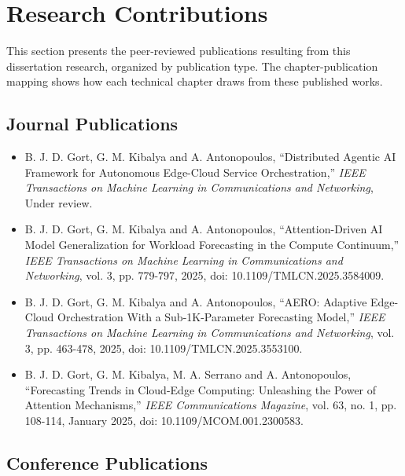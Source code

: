 \section{Research Contributions}
\label{sec:ch1_research_contributions}

This section presents the peer-reviewed publications resulting from this dissertation research, organized by publication type. The chapter-publication mapping shows how each technical chapter draws from these published works.

\subsection*{Journal Publications}

\begin{itemize}

\item[{[J1]}] B. J. D. Gort, G. M. Kibalya and A. Antonopoulos, ``Distributed Agentic AI Framework for Autonomous Edge-Cloud Service Orchestration,'' \textit{\ac{IEEE} Transactions on Machine Learning in Communications and Networking}, Under review.

\item[{[J3]}] B. J. D. Gort, G. M. Kibalya and A. Antonopoulos, ``Attention-Driven AI Model Generalization for Workload Forecasting in the Compute Continuum,'' \textit{\ac{IEEE} Transactions on Machine Learning in Communications and Networking}, vol. 3, pp. 779-797, 2025, doi: 10.1109/TMLCN.2025.3584009.

\item[{[J4]}] B. J. D. Gort, G. M. Kibalya and A. Antonopoulos, ``\ac{AERO}: Adaptive Edge-Cloud Orchestration With a Sub-1K-Parameter Forecasting Model,'' \textit{\ac{IEEE} Transactions on Machine Learning in Communications and Networking}, vol. 3, pp. 463-478, 2025, doi: 10.1109/TMLCN.2025.3553100.

\item[{[J5]}] B. J. D. Gort, G. M. Kibalya, M. A. Serrano and A. Antonopoulos, ``Forecasting Trends in Cloud-Edge Computing: Unleashing the Power of Attention Mechanisms,'' \textit{\ac{IEEE} Communications Magazine}, vol. 63, no. 1, pp. 108-114, January 2025, doi: 10.1109/MCOM.001.2300583.
\end{itemize}

\subsection*{Conference Publications}

